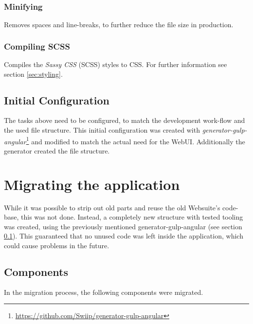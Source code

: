\subsubsection{Minifying} Removes spaces and line-breaks, to further reduce the file size in production.

\subsubsection{Compiling SCSS}
Compiles the \textit{Sassy CSS} (SCSS) styles to CSS. For further information see section \ref{sec:styling}.


\subsection{Initial Configuration}
\label{sec:initial_config}
The tasks above need to be configured, to match the development work-flow and the used file structure. This initial configuration was created with \textit{generator-gulp-angular}\footnote{\url{https://github.com/Swiip/generator-gulp-angular}} and modified to match the actual need for the WebUI. Additionally the generator created the file structure.



\section{Migrating the application}
While it was possible to strip out old parts and reuse the old Websuite's code-base, this was not done. Instead, a completely new structure with tested tooling was created, using the previously mentioned generator-gulp-angular (see section \ref{sec:initial_config}). This guaranteed that no unused code was left inside the application, which could cause problems in the future.\\


\subsection{Components}
In the migration process, the following components were migrated.

